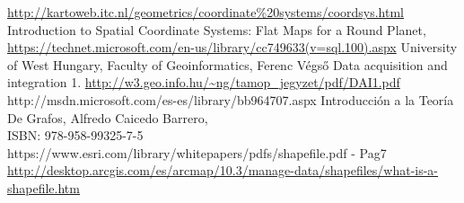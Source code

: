 \begin{thebibliography}{99}
	 \url{http://kartoweb.itc.nl/geometrics/coordinate%20systems/coordsys.html}
	 Introduction to Spatial Coordinate Systems: Flat Maps for a Round Planet,\\ \url{https://technet.microsoft.com/en-us/library/cc749633(v=sql.100).aspx}
	 University of West Hungary, Faculty of Geoinformatics, Ferenc Végső
Data acquisition and integration 1. \url{http://w3.geo.info.hu/~ng/tamop_jegyzet/pdf/DAI1.pdf}
	 http://msdn.microsoft.com/es-es/library/bb964707.aspx
	 Introducción a la Teoría De Grafos, Alfredo Caicedo Barrero, \\ISBN: 978-958-99325-7-5
	 https://www.esri.com/library/whitepapers/pdfs/shapefile.pdf - Pag7
	 \url{http://desktop.arcgis.com/es/arcmap/10.3/manage-data/shapefiles/what-is-a-shapefile.htm}
\end{thebibliography}
